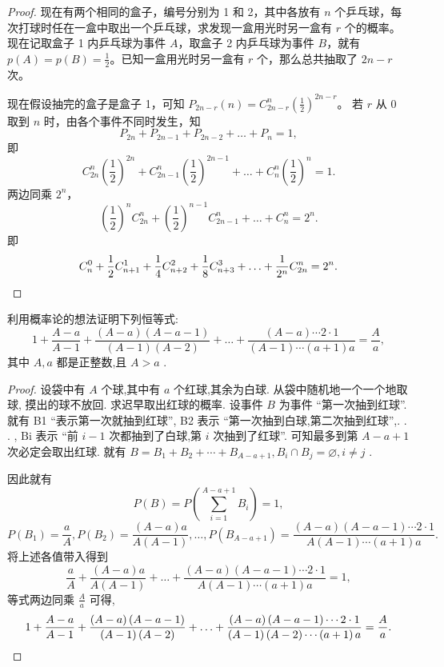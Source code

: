 \begin{proof}
现在有两个相同的盒子，编号分别为 1 和 2，其中各放有 \(n\) 个乒乓球，每次打球时任在一盒中取出一个乒乓球，求发现一盒用光时另一盒有 \(r\) 个的概率。现在记取盒子 1 内乒乓球为事件 \(A\)，取盒子 2 内乒乓球为事件 \(B\)，就有 \(p(A) = p(B) = \frac{1}{2}\)。已知一盒用光时另一盒有 \(r\) 个，那么总共抽取了 \(2n - r\) 次。

现在假设抽完的盒子是盒子 1，可知 \(P_{2n - r}(n) = C_{2n - r}^{n} \left( \frac{1}{2} \right)^{2n - r}\)。
若 \(r\) 从 0 取到 \(n\) 时，由各个事件不同时发生，知
\[
P_{2n} + P_{2n - 1} + P_{2n - 2} + \ldots + P_{n} = 1,
\]
即
\[
C_{2n}^{n} \left( \frac{1}{2} \right)^{2n} + C_{2n - 1}^{n} \left( \frac{1}{2} \right)^{2n - 1} + \ldots + C_{n}^{n} \left( \frac{1}{2} \right)^n = 1. 
\]
两边同乘 \(2^n\)，
\[
\left( \frac{1}{2} \right)^n C_{2n}^{n} + \left( \frac{1}{2} \right)^{n - 1} C_{2n - 1}^{n} + \ldots + C_{n}^{n} = 2^n. 
\]
即
\[
C_{n}^{0} + \frac{1}{2} C_{n + 1}^{1} + \frac{1}{4} C_{n + 2}^{2} + \frac{1}{8} C_{n + 3}^{3} + \ldots + \frac{1}{2^n} C_{2n}^{n} = 2^n. \qedhere
\]
\end{proof}


\begin{example}\label{example:例3. 6}
  利用概率论的想法证明下列恒等式:
\[
1 + \frac{A - a}{A - 1} + \frac{\left( {A - a}\right) \left( {A - a - 1}\right) }{\left( {A - 1}\right) \left( {A - 2}\right) } + \ldots  + \frac{\left( {A - a}\right) \cdots 2 \cdot  1}{\left( {A - 1}\right) \cdots \left( {a + 1}\right) a} = \frac{A}{a},
\]
其中 \(A,a\) 都是正整数,且 \(A > a\) . 
\end{example}

\begin{proof}
  设袋中有 \(A\) 个球,其中有 \(a\) 个红球,其余为白球. 从袋中随机地一个一个地取球, 摸出的球不放回. 求迟早取出红球的概率. 设事件 \(B\) 为事件 “第一次抽到红球”. 就有 B1 “表示第一次就抽到红球”, B2 表示 “第一次抽到白球,第二次抽到红球”,. . . , \(\mathrm{{Bi}}\) 表示 “前 \(i - 1\) 次都抽到了白球,第 \(i\) 次抽到了红球”. 可知最多到第 \(A - a + 1\) 次必定会取出红球. 就有 \(B = {B}_{1} + {B}_{2} + \cdots  + {B}_{A - a + 1}, {B}_{i} \cap  {B}_{j} = \varnothing ,i \neq  j\) . 

因此就有
\[
P\left( B\right)  = P\left( {\sum\limits_{{i = 1}}^{{A - a + 1}}{B}_{i}}\right)  = 1,
\]
\[
P\left( {B}_{1}\right)  = \frac{a}{A},P\left( {B}_{2}\right)  = \frac{\left( {A - a}\right) a}{A\left( {A - 1}\right) },\ldots ,P\left( {B}_{A - a + 1}\right)  = \frac{\left( {A - a}\right) \left( {A - a - 1}\right) \cdots 2 \cdot  1}{A\left( {A - 1}\right) \cdots \left( {a + 1}\right) a}. 
\]
将上述各值带入得到
\[
\frac{a}{A} + \frac{\left( {A - a}\right) a}{A\left( {A - 1}\right) } + \ldots  + \frac{\left( {A - a}\right) \left( {A - a - 1}\right) \cdots 2 \cdot  1}{A\left( {A - 1}\right) \cdots \left( {a + 1}\right) a} = 1,
\]
等式两边同乘 \(\frac{A}{a}\) 可得,
\[
1 + \frac{A - a}{A - 1} + \frac{\left( {A - a}\right) \left( {A - a - 1}\right) }{\left( {A - 1}\right) \left( {A - 2}\right) } + \ldots  + \frac{\left( {A - a}\right) \left( {A - a - 1}\right) \cdots 2 \cdot  1}{\left( {A - 1}\right) \left( {A - 2}\right) \cdots \left( {a + 1}\right) a} = \frac{A}{a}. \qedhere
\]
\end{proof}

